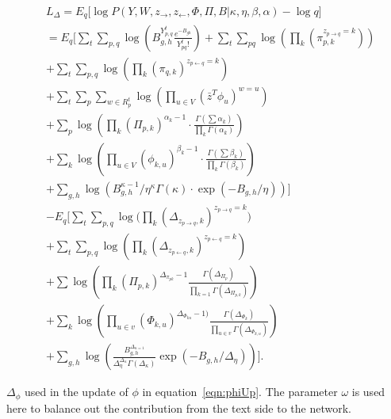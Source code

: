 \begin{align}
&L_{\Delta} = E_{q}\bigg[ \log \! P(Y, W, z_{\rightarrow}, z_{\leftarrow}, \Phi,
\Pi, B | \kappa, \eta, \beta, \alpha) - \log \! q \bigg]\nonumber\\
&= E_{q} \Bigg[ \sum_{t} \! \sum_{p,q} \! \log \left(
B_{g,h}^{Y_{p,q}^t} \frac{e^{-B_{gh}}}{Y_{pq}^{t}!} \right) +
\sum_{t} \! \sum_{pq} \! \log\left( \prod_{k} (\pi_{p,k}^{z_{p \rightarrow q} =
k}) \right) \nonumber\\
&+ \sum_{t} \! \sum_{p,q} \log \! \left(
\prod_{k}(\pi_{q,k})^{z_{p \leftarrow q} = k} \right)\nonumber\\ 
&+\sum_{t} \! \sum_{p} \! \sum_{w\in R_p^t}  \log \! \left(
\prod_{u\in V}(\bar{z}^T\phi_u)^{w = u} \right)
\nonumber\\ &+ 
\sum_{p} \! \log \left( \prod_{k}
(\Pi_{p,k})^{\alpha_{k} - 1} \cdot \frac{\Gamma(\sum \alpha_{k})}{\prod_{k}
\Gamma(\alpha_{k})} \right) \nonumber\\ & + 
\sum_{k} \! \log\left( \prod_{u\in V}
(\phi_{k,u})^{\beta_{k} - 1} \cdot \frac{\Gamma(\sum \beta_{k})}{\prod_{k}
\Gamma(\beta_{k})} \right) \nonumber\\ &+
 \sum_{g,h} \! \log \! \left( B_{g,h}^{\kappa - 1} /
\eta^{\kappa} \Gamma(\kappa) \cdot \exp(-B_{g,h}/\eta) \right) \Bigg]
\nonumber\\ 
& -E_{q} \Bigg[ \sum_{t} \! \sum_{p,q} \log \big( \prod_{k} (\Delta_{z_{p
\rightarrow q}, k})^{z_{p \rightarrow q}=k} \big) \nonumber \\&+ \sum_{t} \!
\sum_{p,q} \! \log \! \left(
\prod_{k} \! (\Delta_{z_{p \leftarrow q}, k})^{z_{p \leftarrow q} = k} \right)
  \nonumber \\
 &+\sum \! \log \left( \prod_{k} \! (\Pi_{p,k})^{\Delta_{\pi_{pk}}-1}
\frac{\Gamma(\Delta_{\Pi_{p}})}{\prod_{k=1} \! \Gamma(\Delta_{\Pi_{p,k}})}
\right) \nonumber \\ &+ 
\sum_{k} \log \! \left( \prod_{u \in v}
(\Phi_{k,u})^{\Delta_{\Phi_{ku}} - 1)} \frac{\Gamma(\Delta_{\Phi_{k}})}
{\prod_{u \in v} \! \Gamma(\Delta_{\Phi_{k,u}})} \right) \nonumber \\ 
&+ \sum_{g,h} \log \! \left(
\frac{B_{g,h}^{\Delta_{\kappa = 1}}}{\Delta_{\eta}^{\Delta_{\kappa}}
\Gamma(\Delta_{\kappa})} \exp(-B_{g,h}/\Delta_{\eta}) \right) \Bigg].
\label{eqn:VarLowerBound}
\end{align}

$\Delta_{\phi}$ used in the update of $\phi$ in equation~\ref{eqn:phiUp}. The
parameter $\omega$ is used here to balance out the contribution from the text
side to the network. 

